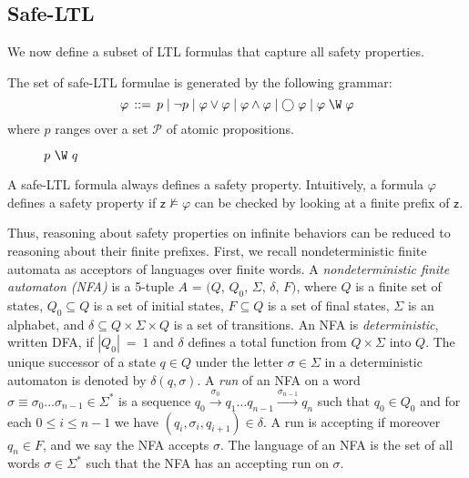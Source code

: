 
\subsection{Safe-LTL}

We now define a subset of LTL formulas that capture all safety properties.

\begin{definition}
The set of safe-LTL formulae is generated by the following grammar:
\[
\varphi\, ::= \, p \mid \lnot p \mid \varphi \vee \varphi \mid \varphi \wedge \varphi \mid \bigcirc\; \varphi \mid \varphi\; \W\; \varphi
\]
where $p$ ranges over a set $\mathcal{P}$ of atomic propositions.
\end{definition}


\begin{figure*}[htb]
\centering
{}
\label{fig:pwq}
\caption[optional]{$p\ \W\ q$}
\end{figure*}

A safe-LTL formula always defines a safety property. 
Intuitively, a formula $\varphi$ defines a safety property if $\mathsf{z}\not\models \varphi$ can 
be checked by looking at a finite prefix of $\mathsf{z}$.

Thus, reasoning about safety properties on infinite behaviors can be reduced to reasoning
about their finite prefixes.
First, we recall nondeterministic finite automata as acceptors of languages over finite words.
A \emph{nondeterministic finite automaton (NFA)} is a 5-tuple 
$A$ = $(Q$, $Q_0$, $\Sigma$, $\delta$, $F)$,
where $Q$ is a finite set of states, $Q_0 \subseteq Q$ is a set of initial states, $F \subseteq Q$
is a set of final states, $\Sigma$ is an alphabet, and $\delta \subseteq Q \times \Sigma \times Q$ is a set of transitions.
An NFA is \emph{deterministic}, written DFA, if $|Q_0|\ =\ 1$ and $\delta$ defines a total function
from $Q \times \Sigma$ into $Q$. 
The unique successor of a state $q\in Q$ under the letter $\sigma\in \Sigma$ 
in a deterministic automaton is denoted by $\delta (q,\sigma)$. A {\em run} of an NFA on a word $\sigma \equiv \sigma_0\ldots\sigma_{n-1}\in\Sigma^*$
is a sequence $q_0 \xrightarrow{\sigma_0} q_1 \ldots q_{n-1} \xrightarrow{\sigma_{n-1}} q_n$ such that $q_0\in Q_0$ and
for each $0\leq i\leq n-1$ we have $(q_i,\sigma_i, q_{i+1})\in\delta$.
A run is accepting if moreover $q_n \in F$, and we say the NFA accepts $\sigma$.
The language of an NFA is the set of all words $\sigma\in \Sigma^*$ such that the NFA has an accepting run on $\sigma$.


